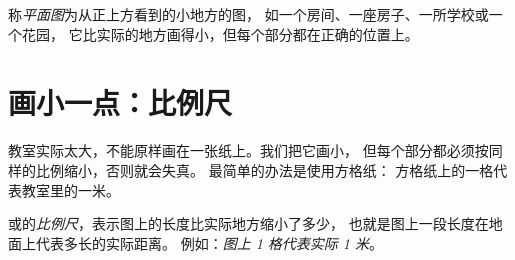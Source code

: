 \begin{definition}[平面图]\label{def:g2:drawing-to-map:plan}
称\emph{平面图}为从正上方看到的小地方的图，
如一个房间、一座房子、一所学校或一个花园，
它比实际的地方画得小，但每个部分都在正确的位置上。
\end{definition}

\section{画小一点：比例尺}

教室实际太大，不能原样画在一张纸上。我们把它画小，
但每个部分都必须按同样的比例缩小，否则就会失真。
最简单的办法是使用方格纸：
方格纸上的一格代表教室里的一米。

\begin{definition}[比例尺]\label{def:g2:drawing-to-map:scale}
或的\emph{比例尺}，表示图上的长度比实际地方缩小了多少，
也就是图上一段长度在地面上代表多长的实际距离。
例如：\emph{图上 1 格代表实际 1 米}。
\end{definition}

